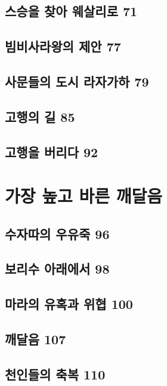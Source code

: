 \documentclass[12pt, a4paper, oneside]{book}
\let\stdsection\section
\renewcommand\section{\newpage\stdsection}
\begin{document}
	\section{스승을 찾아 웨살리로 71 }

	\section{빔비사라왕의 제안 77 }

	\section{사문들의 도시 라자가하 79 }

	\section{고행의 길 85 }

	\section{고행을 버리다 92	}





	\chapter{가장 높고 바른 깨달음}
	\noptcrule
	\parttoc				

	\section{수자따의 우유죽 96 }

	\section{보리수 아래에서 98 }

	\section{마라의 유혹과 위협 100 }

	\section{깨달음 107 }

	\section{천인들의 축복 110 }
\end{document}
